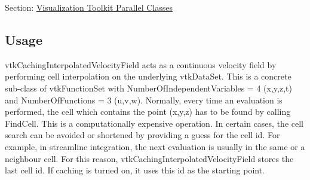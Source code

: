 Section\-: \hyperlink{sec_vtkparallel}{Visualization Toolkit Parallel Classes} \hypertarget{vtkwidgets_vtkxyplotwidget_Usage}{}\subsection{Usage}\label{vtkwidgets_vtkxyplotwidget_Usage}
vtk\-Caching\-Interpolated\-Velocity\-Field acts as a continuous velocity field by performing cell interpolation on the underlying vtk\-Data\-Set. This is a concrete sub-\/class of vtk\-Function\-Set with Number\-Of\-Independent\-Variables = 4 (x,y,z,t) and Number\-Of\-Functions = 3 (u,v,w). Normally, every time an evaluation is performed, the cell which contains the point (x,y,z) has to be found by calling Find\-Cell. This is a computationally expensive operation. In certain cases, the cell search can be avoided or shortened by providing a guess for the cell id. For example, in streamline integration, the next evaluation is usually in the same or a neighbour cell. For this reason, vtk\-Caching\-Interpolated\-Velocity\-Field stores the last cell id. If caching is turned on, it uses this id as the starting point.

